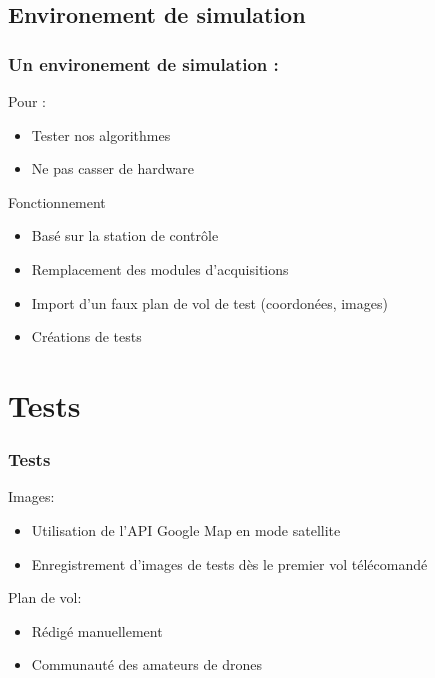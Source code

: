 \documentclass[transparent]{beamer}
\begin{document}
\subsection{Environement de simulation}

\begin{frame}
	\frametitle{Un environement de simulation :}
	\begin{block}{Pour :}
			\begin{itemize}
				\item Tester nos algorithmes
				\item Ne pas casser de hardware
			\end{itemize}
	\end{block}
	\begin{block}{Fonctionnement}
			\begin{itemize}
				\item Basé sur la station de contrôle
				\item Remplacement des modules d'acquisitions
				\item Import d'un faux plan de vol de test (coordonées, images)
				\item Créations de tests
			\end{itemize}
	\end{block}
\end{frame}


\section{Tests}

\begin{frame}
\frametitle{Tests}
	\begin{block}{Images:}
			\begin{itemize}
				\item Utilisation de l'API Google Map en mode satellite
				\item Enregistrement d'images de tests dès le premier vol télécomandé
			\end{itemize}
	\end{block}
	\begin{block}{Plan de vol:}
			\begin{itemize}
				\item Rédigé manuellement
				\item Communauté des amateurs de drones
			\end{itemize}
	\end{block}
\end{frame}
\end{document}

